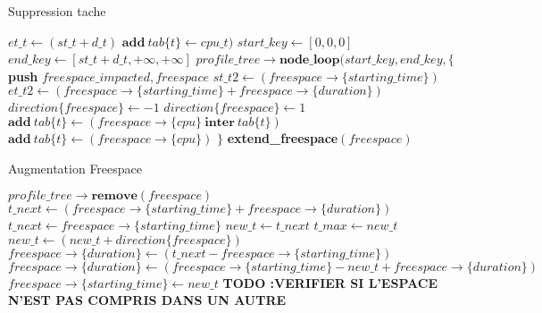 \documentclass{report}
\begin{document}
\begin{algorithm}
\caption{Suppression tache}\label{Remove}
\begin{algorithmic}[1]
	\State $et\_t \gets (st\_t + d\_t)$
	\State
		\State $\textbf{add}\ tab\{t\}\gets cpu\_t)$
	\EndFor
	\State
	\State $start\_key\gets[0, 0, 0]$
	\State $end\_key\gets[st\_t + d\_t, +\infty, +\infty]$
	\State
	\State $profile\_tree\rightarrow \textbf{node\_loop}(start\_key, end\_key, \{$
		\State
			\State \textbf{push} $freespace\_impacted, freespace$
			\State $st\_t2\gets (freespace\rightarrow\{starting\_time\})$
			\State $et\_t2\gets (freespace\rightarrow\{starting\_time\} + freespace\rightarrow\{duration\})$
			\State
				\State $direction\{freespace\} \gets -1$
				\State $direction\{freespace\} \gets 1$
			\EndIf
			\State
					\State					
						\State $\textbf{add}\ tab\{t\}\gets (freespace\rightarrow\{cpu\}\ \textbf{inter}\ tab\{t\})$
					\Else
						\State $\textbf{add}\ tab\{t\}\gets (freespace\rightarrow\{cpu\})$
					\EndIf
					\State
				\EndFor
			\EndIf
		\EndIf
	\State $\}$
	\State
		\State \textbf{extend\_freespace}$(freespace)$
	\EndFor
\EndFunction
\end{algorithmic}
\end{algorithm}

\begin{algorithm}
\caption{Augmentation Freespace}\label{extend_freespace}
\begin{algorithmic}[1]
	\State $profile\_tree\rightarrow \textbf{remove}(freespace)$
	\State	
		\State $t\_next \gets (freespace\rightarrow\{starting\_time\} + freespace\rightarrow\{duration\} )$
	\Else
		\State $t\_next \gets freespace\rightarrow\{starting\_time\} $
	\EndIf
	\State
	\State $new\_t \gets t\_next$
		\State $t\_max \gets new\_t$
		\State $new\_t \gets (new\_t + direction\{freespace\})$
	\EndWhile
	\State
		\State $freespace\rightarrow\{duration\} \gets (t\_next - freespace\rightarrow\{starting\_time\})$
	\Else
		\State $freespace\rightarrow\{duration\} \gets (freespace\rightarrow\{starting\_time\} - new\_t + freespace\rightarrow\{duration\})$
		\State $freespace\rightarrow\{starting\_time\} \gets new\_t$
	\EndIf
	\State
	\State \textbf{TODO :VERIFIER SI L'ESPACE N'EST PAS COMPRIS DANS UN AUTRE}
\EndFunction
\end{algorithmic}
\end{algorithm}
\end{document}
